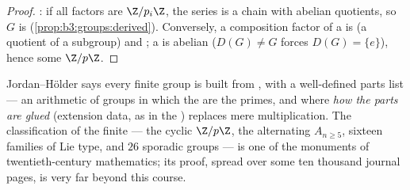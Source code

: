 \begin{proof}
: if all factors are $\Z/p_i\Z$, the series is a chain
with abelian quotients, so $G$ is 
(\cref{prop:b3:groups:derived}). Conversely, a composition factor
of a  is  (a quotient of a subgroup) and
; a   is abelian ($D(G) \ne G$ forces
$D(G) = \{e\}$), hence some $\Z/p\Z$.
\end{proof}

\begin{remark}\label{rem:b3:groups:jhmeaning}
Jordan--H\"older says every finite group is built from , with a well-defined parts list --- an arithmetic of groups
in which the  are the primes, and where \emph{how the
parts are glued} (extension data, as in the )
replaces mere multiplication. The classification of the finite
 --- the cyclic $\Z/p\Z$, the alternating $A_{n \geq
5}$, sixteen families of Lie type, and $26$ sporadic groups --- is
one of the monuments of twentieth-century mathematics; its proof,
spread over some ten thousand journal pages, is very far beyond
this course.
\end{remark}


